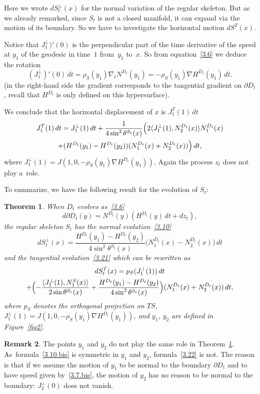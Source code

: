 \documentclass[JEP,XML,SOM,Unicode,NoFloatCountersInSection,published]{cedram}
\theoremstyle{plain}
\newtheorem{thm}{Theorem}[section]
\theoremstyle{definition}
\newtheorem{remark}[thm]{Remark}
\let\f\frac
\let\n\nabla
\let\pa\partial
\begin{document}
Here we wrote $dS_t^\perp (x)$ for the normal variation of the regular skeleton. But as we already remarked, since $S_t$ is not a closed manifold, it can expand via the motion of its boundary. So we have to investigate the horizontal motion $dS^T(x)$.

{Notice that $J_1^\perp)'(0)$ is the perpendicular part of the time derivative of the speed at $y_1$ of the geodesic in time~$1$ from~$y_1$ to~$x$. So
from} equation~\eqref{3.6} we deduce the rotation
\begin{equation}%
(J_1^\perp)'(0)\,dt= {{\rho_S(y_1)}}\n_{t}N^{D_t}(y_1)=-{{\rho_S(y_1)}}\n H^{D_t}(y_1)\,dt.
\end{equation}
{(in the right-hand side the gradient corresponds to the tangential gradient on $\pa D_t$, recall that $H^{D_t}$ is only defined on this hypersurface).}\par
We conclude that the horizontal displacement of $x$ is $J^T_1(1)\,dt$
\begin{multline}
\label{3.21}
J^T_1(1)\,dt=J_1^\perp(1)\,dt+\f1{4\sin^2\theta^{S_t}(x)}\Bigl(2\langle J_1^\perp(1),N^{D_t}_2(x)\rangle N^{D_t}_1(x)\\
+(H^{D_t}(y_1)-H^{D_t}(y_2))(N^{D_t}_1(x)+N^{D_t}_2(x))\Bigr)\,dt,
\end{multline}
where $J_1^\perp(1)\!=\!J(1,0,-{\rho_S(y_1)}\n H^{D_t}(y_1))$.
Again the process $z_t$ does not play a~role.

To summarize, we have the following result for the evolution of $S_t$:
\begin{thm}
\label{T3.1}
When $D_t$ evolves as~\eqref{3.6}
\begin{equation}
\label{3.7.bis}
d\partial D_t(y)=N^{D_t}(y)(H^{D_t}(y)\, dt +dz_t),
\end{equation}
the regular skeleton $S_t$ has the normal evolution~\eqref{3.10}
\begin{equation}
\label{3.10.bis}
dS_t^\perp (x)=\f{H^{D_t}(y_1)-H^{D_t}(y_2)}{4\sin^2\theta^{S_t}(x)}\bigl(N_1^{D_t}(x)-N_2^{D_t}(x)\bigr)\, dt
\end{equation}
and the tangential evolution~\eqref{3.21} which can be rewritten as
\begin{multline}
\label{3.22}
dS_t^T(x)=p_S(J_1^\perp(1))\, dt\\
+\Bigl(-\f{\langle J_1^\perp(1), N_1^S(x)\rangle}{2\sin\theta^{S_t}(x)}+\f{H^{D_t}(y_1)-H^{D_t}(y_2)}{4\sin^2\theta^{S_t}(x)}\Bigr)(N^{D_t}_1(x)+N^{D_t}_2(x))\,dt,
\end{multline}
where $p_S$ denotes the orthogonal projection on $TS$, $J_1^\perp(1)\!=\!J(1,0,-{\rho_S(y_1)}\n H^{D_t}(y_1))$, and $y_1$, $y_2$ are defined in Figure~\ref{fig2}.
\end{thm}
\begin{remark}
\label{R3.1}
The points $y_1$ and $y_2$ do not play the same role in Theorem~\ref{T3.1}. As~for\-mula~\eqref{3.10.bis} is symmetric in $y_1$ and $y_2$, formula~\eqref{3.22} is not. The reason is that if we assume the motion of $y_1$ to be normal to the boundary $\partial D_t$ and to have speed given by~\eqref{3.7.bis}, the motion of $y_2$ has no reason to be normal to the boundary: $J_2^\perp(0)$ does not vanish.
\end{remark}
\end{document}
